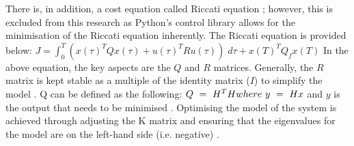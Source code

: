 There is, in addition, a cost equation called Riccati equation \cite{hassani2014optimal};
however, this is excluded from this research as Python's control library
allows for the minimisation of the Riccati equation inherently. The Riccati equation is provided below:
\newline\newline
\begin{math}
J =
\int_0^T  \left( x(\tau)^T Qx(\tau) +
u(\tau)^T R u(\tau) \right) \; d\tau + x(T)^T Q_fx(T)
\end{math}
\newline\newline
In the above equation, the key aspects are the \begin{math} Q \end{math} and \begin{math} R \end{math} matrices. Generally, the \begin{math} R \end{math} matrix is kept stable as a multiple of the identity matrix (\begin{math} I \end{math}) to simplify the model \cite{das2013lqr}. Q can be defined as the following:
\newline\newline
\begin{math}
Q\ =\ H^{T} H\ \\
\\
where\ y\ =\ Hx
\end{math}
\newline\newline
and \begin{math} y \end{math} is the output that needs to be minimised \cite{das2013lqr}.
\newline\newline
Optimising the model of the system is achieved through adjusting the
K matrix and ensuring that the eigenvalues for the model are on the
left-hand side (i.e. negative) \cite{munje2018state}.
